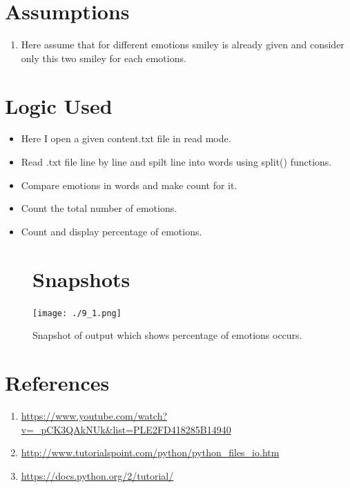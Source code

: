 \documentclass[a4paper,10pt]{report}
\begin{document}
 \section{Assumptions}
\begin{enumerate}
\item Here assume that for different emotions smiley is already given and consider only this two smiley for each emotions.
\end{enumerate}
 \section{Logic Used}
 \begin{itemize}
  \item Here I open a given content.txt file in read mode.
  \item Read .txt file line by line and spilt line into words using split() functions.
  \item Compare emotions in words and make count for it.
  \item Count the total number of emotions.
  \item Count and display percentage of emotions.
 \end{itemize}
 
 \newpage
 \begin{figure}
  


\section{Snapshots}
 
 \begin{center}
 \texttt{[image: ./9\_1.png]}
 \caption{Snapshot of output which shows percentage of emotions occurs.}
\end{center}
 \end{figure}
\section{References}
 \begin{enumerate} 
\item\url{ https://www.youtube.com/watch?v=_pCK3QAkNUk&list=PLE2FD418285B14940}
\item\url{http://www.tutorialspoint.com/python/python_files_io.htm}
\item\url{https://docs.python.org/2/tutorial/}
 \end{enumerate}

 
 
\end{document}
